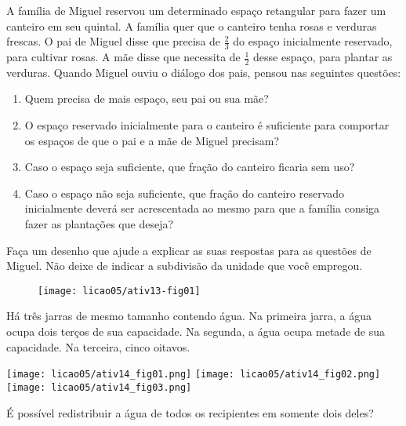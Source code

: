 \begin{atividade}{}\label{chap5-ativ13}

A família de Miguel reservou um determinado espaço retangular para fazer um canteiro em seu quintal. A família quer que o canteiro tenha rosas e verduras frescas. O pai de Miguel disse que precisa de $\frac{2}{3}$ do espaço inicialmente reservado, para cultivar rosas. A mãe disse que necessita de $\frac{1}{2}$ desse espaço, para plantar as verduras. Quando Miguel ouviu o diálogo dos pais, pensou nas seguintes questões:
\begin{enumerate}  %
  \item     Quem precisa de mais espaço, seu pai ou sua mãe?
  \item     O espaço reservado inicialmente para o canteiro é suficiente para comportar os espaços de que o pai e a mãe de Miguel precisam?
  \item     Caso o espaço seja suficiente, que fração do canteiro ficaria sem uso?
  \item     Caso o espaço não seja suficiente, que fração do canteiro reservado inicialmente deverá ser acrescentada ao mesmo para que a família consiga fazer as plantações que deseja?
\end{enumerate} %


Faça um desenho que ajude a explicar as suas respostas para as questões de Miguel. Não deixe de indicar a subdivisão da unidade que você empregou.

\begin{figure}[H]
\centering

\texttt{[image: licao05/ativ13-fig01]}
\end{figure}
\end{atividade}

\clearpage
\begin{atividade}{}\label{chap5-ativ14}

Há três jarras de mesmo tamanho contendo água. 
Na primeira jarra, a água ocupa dois terços de sua capacidade. 
Na segunda, a água ocupa metade de sua capacidade. 
Na terceira, cinco oitavos.

\begin{center}
  \texttt{[image: licao05/ativ14\_fig01.png]}\hspace{1cm}
    \texttt{[image: licao05/ativ14\_fig02.png]}\hspace{1cm}
      \texttt{[image: licao05/ativ14\_fig03.png]}
\end{center}

É possível redistribuir a água de todos os recipientes em somente dois deles?
\end{atividade}

